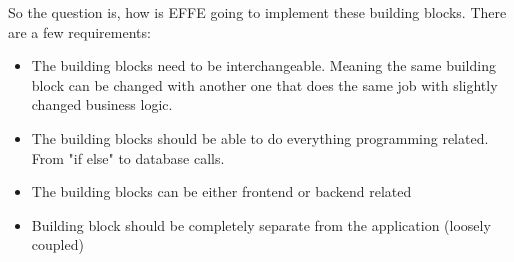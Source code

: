 So the question is, how is EFFE going to implement these building blocks. There are a few requirements:
\begin{itemize}
	\item The building blocks need to be interchangeable. Meaning the same building block can be changed with another one that does the same job with slightly changed business logic.

	\item The building blocks should be able to do everything programming related. From "if else" to database calls.

	\item The building blocks can be either frontend or backend related

	\item Building block should be completely separate from the application (loosely coupled)
\end{itemize}
